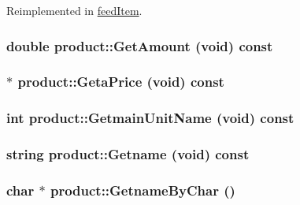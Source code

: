 Reimplemented in \hyperlink{classfeed_item_a4f69deaedb7678ebab0aa8feb267ac64}{feedItem}.\hypertarget{classproduct_a021ebef2da57e1d977cfe57e62c6e38b}{
\subsubsection[{GetAmount}]{\setlength{\rightskip}{0pt plus 5cm}double product::GetAmount (void) const}}
\label{classproduct_a021ebef2da57e1d977cfe57e62c6e38b}
\hypertarget{classproduct_a4fb7108257c255930ec5b09fad050340}{
\subsubsection[{GetaPrice}]{$\ast$ product::GetaPrice (void) const}}
\label{classproduct_a4fb7108257c255930ec5b09fad050340}
\hypertarget{classproduct_a28f9ed799fc616fd9c40250abfbfe0df}{
\subsubsection[{GetmainUnitName}]{\setlength{\rightskip}{0pt plus 5cm}int product::GetmainUnitName (void) const}}
\label{classproduct_a28f9ed799fc616fd9c40250abfbfe0df}
\hypertarget{classproduct_a30dda8ef0877194db7965bc7a730c401}{
\subsubsection[{Getname}]{\setlength{\rightskip}{0pt plus 5cm}string product::Getname (void) const}}
\label{classproduct_a30dda8ef0877194db7965bc7a730c401}
\hypertarget{classproduct_a28d4c7421c7991066be1399f8b924116}{
\subsubsection[{GetnameByChar}]{\setlength{\rightskip}{0pt plus 5cm}char $\ast$ product::GetnameByChar ()}}

